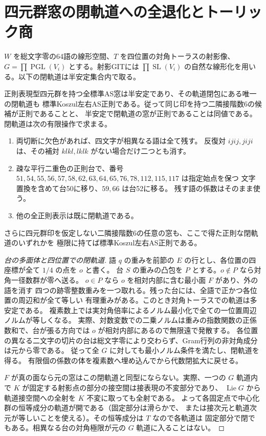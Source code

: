 \section{四元群窓の閉軌道への全退化とトーリック商}
\label{sec:klein-polystable-limits}
$W$ を総文字零の64語の線形空間、$T$ を四位置の対角トーラスの射影像、
$G=\prod\operatorname{PGL}(V_i)$ とする。射影GITには
$\prod\operatorname{SL}(V_i)$ の自然な線形化を用いる。以下の閉軌道は半安定集合内で取る。
\begin{theorem}\label{thm:klein-polystable-limits}
正則表現型四元群を持つ全標準AS窓は半安定であり、その軌道閉包にある唯一の閉軌道も
標準Koszul左右AS正則である。従って同じ印を持つ二隣接階数6の候補が正則であることと、
半安定で閉軌道の窓が正則であることは同値である。閉軌道は次の有限操作で求まる。
\begin{enumerate}
\item 両切断に欠色があれば、四文字が相異なる語は全て残す。
反復対 $ijij,jiji$ は、その補対 $klkl,lklk$ がない場合だけ二つとも消す。
\item 疎な平行二重色の正則台で、番号
$51,54,55,56,57,58,62,63,64,65,76,78,112,115,117$ は指定始点を保つ
文字置換を含めて台50に移り、$59,66$ は台52に移る。
残す語の係数はそのまま使う。
\item 他の全正則表示は既に閉軌道である。
\end{enumerate}
さらに四元群印を仮定しない二隣接階数6の任意の窓も、ここで得た正則な閉軌道のいずれかを
極限に持てば標準Koszul左右AS正則である。
\end{theorem}
\begin{proof}[台の多面体と四位置での閉軌道]
語 $q$ の重みを前節の $E$ の行とし、各位置の四座標が全て $1/4$ の点を $o$ と書く。
台 $S$ の重みの凸包を $P$ とする。$o\notin P$ なら対角一径数群が零へ送る。
$o\in P$ なら $o$ を相対内部に含む最小面 $F$ があり、外の語を消す
四つの跡零整数重みを一つ取れる。残った台には、全語で正かつ各位置の周辺和が全て等しい
有理重みがある。このとき対角トーラスでの軌道は多安定である。
複素数上では実対角倍率によるノルム最小化で全ての一位置周辺ノルムが等しくなる。
実際、対数変数での二乗ノルムは重みの指数関数の正係数和で、台が張る方向では
$o$ が相対内部にあるので無限遠で発散する。
各位置の異なる二文字の切片の台は総文字零により交わらず、Gram行列の非対角成分は元から零である。
従って全 $G$ に対しても最小ノルム条件を満たし、閉軌道を得る。
有限個の係数の体を複素数へ埋め込んでから代数閉拡大に戻せる。

$F$ が真の面なら元の窓はこの閉軌道と同型にならない。実際、一つの $G$ 軌道内で
$K$ が固定する射影点の部分の接空間は接表現の不変部分であり、
$\operatorname{Lie}G$ から軌道接空間への全射を $K$ 不変に取っても全射である。
よって各固定点で中心化群の恒等成分の軌道が開である（固定部分は滑らかで、
または接次元と軌道次元が等しいことを使える）。その恒等成分は $T$ なので各軌道は
固定部分で閉でもある。相異なる台の対角極限が元の $G$ 軌道に入ることはない。
\end{proof}

